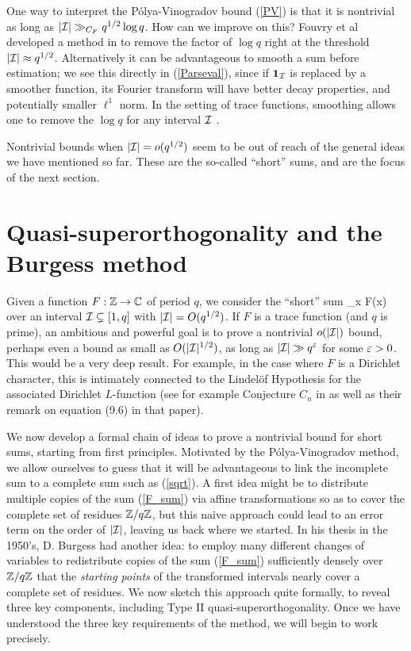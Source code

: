 \documentclass[oneside,11pt]{amsart}
\begin{document}
One way to interpret the P\'olya-Vinogradov bound (\ref{PV}) is that it is nontrivial as long as $|\mathcal{I}| \gg_{C_F} q^{1/2}\log q$. How can we improve on this? 
Fouvry et al developed a method in \cite{FKMRRS17} to remove the factor of $\log q$ right at the threshold $|\mathcal{I}| \approx q^{1/2}$.
Alternatively it can be advantageous to smooth a sum before estimation; we see this directly in (\ref{Parseval}), since if $\boldsymbol1_{\mathcal{I}}$ is replaced by a smoother function, its Fourier transform will have better decay properties, and potentially smaller $\ell^1$ norm. 
In the setting of trace functions, smoothing allows one to remove the $\log q$ for any interval $\mathcal{I}$  \cite[Prop. 6.5]{FKMS19}.
 

Nontrivial bounds when $|\mathcal{I}| = o(q^{1/2})$ seem to be out of reach of the general ideas we have mentioned so far.  
These are the so-called ``short'' sums, and are the focus of the next section.





\section{Quasi-superorthogonality and the Burgess method}\label{sec_Burgess_method}

Given a function $F: \mathbb{Z} \rightarrow \mathbb{C}$ of period $q$, we consider the ``short'' sum
\beq\label{F_sum}
 \sum_{x \in \Ical} F(x) 
 \eeq
over an interval $\mathcal{I} \subsetneq [1,q]$ with  $|\mathcal{I}| = O(q^{1/2})$.
If $F$ is a trace function (and $q$ is prime), an ambitious and powerful goal is to prove a nontrivial $o(|\mathcal{I}|)$ bound,  perhaps even a bound as small as $O(|\mathcal{I}|^{1/2})$, as long as $|\mathcal{I}| \gg q^{\varepsilon}$ for some $\varepsilon>0$. This  would be a very deep result. For example, in the case where $F$ is a Dirichlet character, this is intimately connected to the Lindel\"of Hypothesis for the associated Dirichlet $L$-function (see for example Conjecture $C_n$ in  \cite[\S 9]{FIMR13} as well as their remark on equation (9.6) in that paper).



We now develop a formal chain of ideas to prove a nontrivial bound for short sums, starting from first principles.  Motivated by the P\'olya-Vinogradov method, we allow ourselves to guess that it will be advantageous to link the incomplete sum to a complete sum such as (\ref{sqrt}).
A first idea might be to  distribute multiple copies of the sum (\ref{F_sum}) via affine transformations so as to cover the complete set of residues $\mathbb{Z}/q\mathbb{Z}$, but this naive approach could lead to an error term   on the order of $ |\mathcal{I}|$, leaving us back where we started. In his thesis in the 1950's, D.  Burgess had another idea: to employ many different changes of variables to redistribute copies of the sum (\ref{F_sum}) sufficiently densely over $\mathbb{Z}/q\mathbb{Z}$ that the \emph{starting points} of the transformed intervals nearly cover a complete set of residues. 
We now sketch this approach quite formally, to reveal three key components, including Type II quasi-superorthogonality.
 Once we have understood the three key requirements of the method, we will begin to work precisely.
\end{document}
